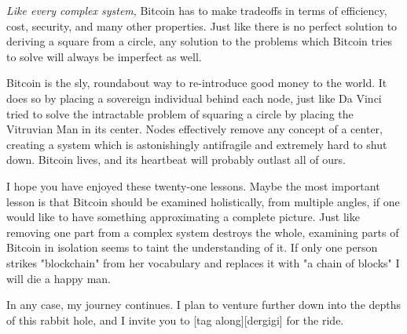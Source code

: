 \textit{Like every complex system}, Bitcoin has to make tradeoffs in terms
of efficiency, cost, security, and many other properties. Just like there is no
perfect solution to deriving a square from a circle, any solution to the
problems which Bitcoin tries to solve will always be imperfect as well.


Bitcoin is the sly, roundabout way to re-introduce good money to the world. It
does so by placing a sovereign individual behind each node, just like Da Vinci
tried to solve the intractable problem of squaring a circle by placing the
Vitruvian Man in its center. Nodes effectively remove any concept of a center,
creating a system which is astonishingly antifragile and extremely hard to shut
down. Bitcoin lives, and its heartbeat will probably outlast all of ours.

I hope you have enjoyed these twenty-one lessons. Maybe the most important
lesson is that Bitcoin should be examined holistically, from multiple angles, if
one would like to have something approximating a complete picture. Just like
removing one part from a complex system destroys the whole, examining parts of
Bitcoin in isolation seems to taint the understanding of it. If only one person
strikes "blockchain" from her vocabulary and replaces it with "a chain of
blocks" I will die a happy man.

In any case, my journey continues. I plan to venture further down into the
depths of this rabbit hole, and I invite you to [tag along][dergigi] for the ride.

%
